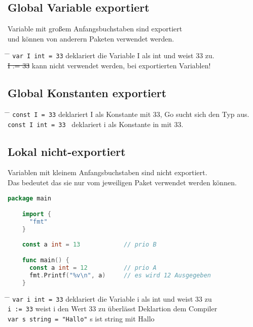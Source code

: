 \documentclass[twoside,a4paper,12pt]{article}
\begin{document}
\subsection{Global Variable exportiert}
Variable mit großem Anfangsbuchstaben sind exportiert \\ 
und können von anderern Paketen verwendet werden. \\ 
\begin{tabbing}
 \hspace{2mm} \= \hspace{50mm} \= \kill
 \> \verb|var I int = 33| \>deklariert die Variable I als int und weist 33 zu. \\ 
 \> \sout{I := 33} \>kann nicht verwendet werden, bei exportierten Variablen!
\end{tabbing}

\subsection{Global Konstanten exportiert}
\begin{tabbing}
 \hspace{2mm} \= \hspace{50mm} \= \kill
 \> \verb|const I = 33| \> deklariert I als Konstante mit 33, Go sucht sich den Typ aus. \\ 
 \> \verb|const I int = 33 | \> deklariert i als Konstante in mit 33. \\
\end{tabbing}

\subsection{Lokal nicht-exportiert}
Variablen mit kleinem Anfangsbuchstaben sind nicht exportiert. \\ 
Das bedeutet das sie nur vom jeweiligen Paket verwendet werden können.
\begin{center}
  \begin{minipage}{1.0\textwidth}
    \begin{lstlisting}[language=Go]
    package main 

    import {
      "fmt"
    }
    
    const a int = 13            // prio B

    func main() {
      const a int = 12          // prio A
      fmt.Printf("%v\n", a)     // es wird 12 Ausgegeben
    }

    \end{lstlisting}
  \end{minipage}
\end{center}
\begin{tabbing}
 \hspace{2mm} \= \hspace{50mm} \= \kill
 \> \verb|var i int = 33| \> deklariert die Variable i als int und weist 33 zu \\
 \> \verb|i := 33| \> weist i den Wert 33 zu überlässt Deklartion dem  Compiler \\
 \> \verb|var s string = "Hallo"| \> s ist string mit Hallo \\
\end{tabbing}
\end{document}

